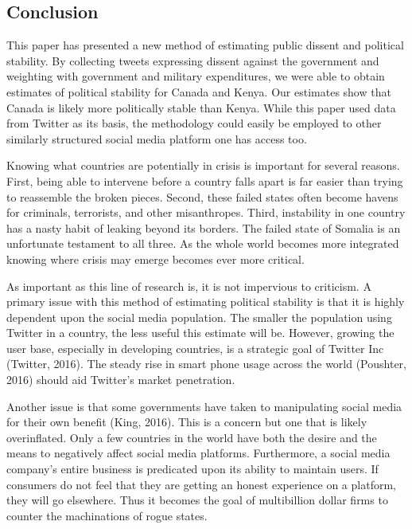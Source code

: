 \documentclass[12pt]{article}
\begin{document}
\begin{spacing}{1.5}
\section*{Conclusion}

This paper has presented a new method of estimating public dissent and political stability. By collecting tweets expressing dissent against the government and weighting with government and military expenditures, we were able to obtain estimates of political stability for Canada and Kenya. Our estimates show that Canada is likely more politically stable than Kenya. While this paper used data from Twitter as its basis, the methodology could easily be employed to other similarly structured social media platform one has access too.    


Knowing what countries are potentially in crisis is important for several reasons. First, being able to intervene before a country falls apart is far easier than trying to reassemble the broken pieces. Second, these failed states often become havens for criminals, terrorists, and other misanthropes. Third, instability in one country has a nasty habit of leaking beyond its borders. The failed state of Somalia is an unfortunate testament to all three. As the whole world becomes more integrated knowing where crisis may emerge becomes ever more critical. 


As important as this line of research is, it is not impervious to criticism. A primary issue with this method of estimating political stability is that it is highly dependent upon the social media population. The smaller the population using Twitter in a country, the less useful this estimate will be. However, growing the user base, especially in developing countries, is a strategic goal of Twitter Inc (Twitter, 2016). The steady rise in smart phone usage across the world (Poushter, 2016) should aid Twitter's market penetration. 

Another issue is that some governments have taken to manipulating social media for their own benefit (King, 2016). This is a concern but one that is likely overinflated. Only a few countries in the world have both the desire and the means to negatively affect social media platforms. Furthermore, a social media company's entire business is predicated upon its ability to maintain users. If consumers do not feel that they are getting an honest experience on a platform, they will go elsewhere. Thus it becomes the goal of multibillion dollar firms to counter the machinations of rogue states. 


\end{spacing}
\end{document}

